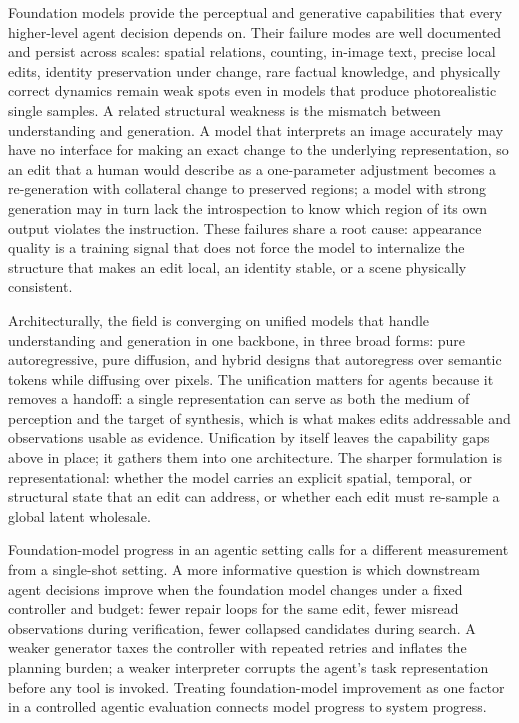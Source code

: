 Foundation models provide the perceptual and generative capabilities that every higher-level agent decision depends on. Their failure modes are well documented and persist across scales: spatial relations, counting, in-image text, precise local edits, identity preservation under change, rare factual knowledge, and physically correct dynamics remain weak spots even in models that produce photorealistic single samples. A related structural weakness is the mismatch between understanding and generation. A model that interprets an image accurately may have no interface for making an exact change to the underlying representation, so an edit that a human would describe as a one-parameter adjustment becomes a re-generation with collateral change to preserved regions; a model with strong generation may in turn lack the introspection to know which region of its own output violates the instruction. These failures share a root cause: appearance quality is a training signal that does not force the model to internalize the structure that makes an edit local, an identity stable, or a scene physically consistent.

Architecturally, the field is converging on unified models that handle understanding and generation in one backbone, in three broad forms: pure autoregressive, pure diffusion, and hybrid designs that autoregress over semantic tokens while diffusing over pixels. The unification matters for agents because it removes a handoff: a single representation can serve as both the medium of perception and the target of synthesis, which is what makes edits addressable and observations usable as evidence. Unification by itself leaves the capability gaps above in place; it gathers them into one architecture. The sharper formulation is representational: whether the model carries an explicit spatial, temporal, or structural state that an edit can address, or whether each edit must re-sample a global latent wholesale.

Foundation-model progress in an agentic setting calls for a different measurement from a single-shot setting. A more informative question is which downstream agent decisions improve when the foundation model changes under a fixed controller and budget: fewer repair loops for the same edit, fewer misread observations during verification, fewer collapsed candidates during search. A weaker generator taxes the controller with repeated retries and inflates the planning burden; a weaker interpreter corrupts the agent's task representation before any tool is invoked. Treating foundation-model improvement as one factor in a controlled agentic evaluation connects model progress to system progress.

